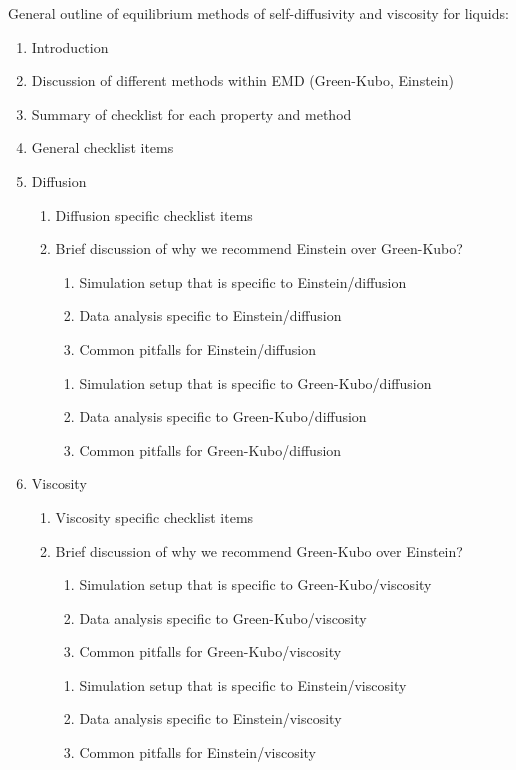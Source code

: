 \documentclass[9pt]{livecoms}
\begin{document}
General outline of equilibrium methods of self-diffusivity and viscosity for liquids:
\begin{enumerate}
	\item Introduction
	\item Discussion of different methods within EMD (Green-Kubo, Einstein)
	\item Summary of checklist for each property and method 
	\item General checklist items
	\item Diffusion
	\begin{enumerate}
		\item Diffusion specific checklist items
		\item Brief discussion of why we recommend Einstein over Green-Kubo?
		\begin{enumerate}
			\item Simulation setup that is specific to Einstein/diffusion 
		    \item Data analysis specific to Einstein/diffusion
		    \item Common pitfalls for Einstein/diffusion
		\end{enumerate}
		\begin{enumerate}
			\item Simulation setup that is specific to Green-Kubo/diffusion 
			\item Data analysis specific to Green-Kubo/diffusion
			\item Common pitfalls for Green-Kubo/diffusion
		\end{enumerate}	
	\end{enumerate}
	\item Viscosity
	\begin{enumerate}
		\item Viscosity specific checklist items
		\item Brief discussion of why we recommend Green-Kubo over Einstein?
		\begin{enumerate}
			\item Simulation setup that is specific to Green-Kubo/viscosity
			\item Data analysis specific to Green-Kubo/viscosity
			\item Common pitfalls for Green-Kubo/viscosity 
		\end{enumerate}
        \begin{enumerate}
        	\item Simulation setup that is specific to Einstein/viscosity
        	\item Data analysis specific to Einstein/viscosity
        	\item Common pitfalls for Einstein/viscosity 
        \end{enumerate}
	\end{enumerate}
\end{enumerate}
\end{document}
